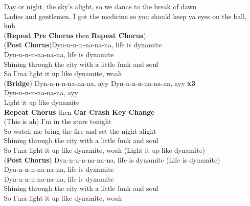 Day or night, the sky's alight, so we dance to the break of dawn\\
Ladies and gentlemen, I got the medicine so you should keep ya eyes on the ball, huh\\
(\textbf{Repeat Pre Chorus} then \textbf{Repeat Chorus})\\
(\textbf{Post Chorus})Dyn-n-n-n-na-na-na, life is dynamite\\
Dyn-n-n-n-na-na-na, life is dynamite\\
Shining through the city with a little funk and soul\\
So I'ma light it up like dynamite, woah\\
(\textbf{Bridge}) Dyn-n-n-n-na-na-na, ayy Dyn-n-n-n-na-na-na, ayy  \textbf{x3}\\
Dyn-n-n-n-na-na-na, ayy\\
Light it up like dynamite\\
\textbf{Repeat Chorus} then \textbf{Car Crash Key Change}\\
(This is ah) I'm in the stars tonight \\
So watch me bring the fire and set the night alight\\
Shining through the city with a little funk and soul\\
So I'ma light it up like dynamite, woah (Light it up like dynamite)\\
(\textbf{Post Chorus}) Dyn-n-n-n-na-na-na, life is dynamite (Life is dynamite)\\
Dyn-n-n-n-na-na-na, life is dynamite\\
Dyn-n-n-n-na-na-na, life is dynamite\\
Shining through the city with a little funk and soul\\
So I'ma light it up like dynamite, woah




